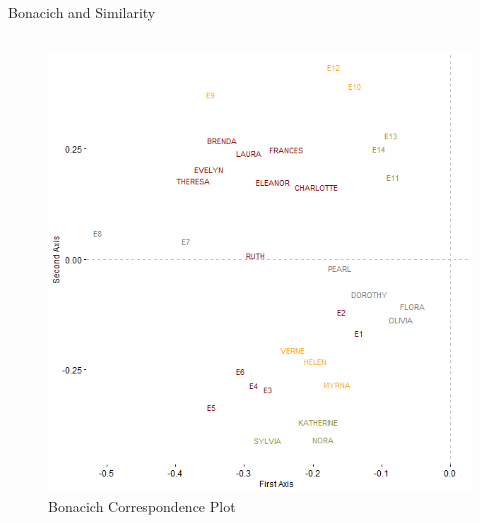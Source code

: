 \documentclass[
  ignorenonframetext,
]{beamer}
\begin{document}
\begin{frame}{Bonacich and Similarity}
\begin{columns}[T]
\begin{column}{0.55\textwidth}
\begin{figure}

{\centering \includegraphics{Plots/bon-corr-plot.png}

}

\caption{Bonacich Correspondence Plot}

\end{figure}
\end{column}
\end{columns}
\end{frame}
\end{document}

